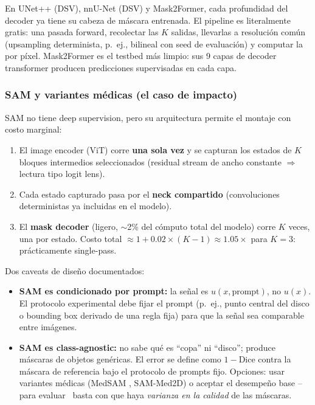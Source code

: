 \documentclass[12pt,a4paper]{article}
\newcommand{\UQ}{\text{UQ}}
\begin{document}
En UNet++ (DSV), nnU-Net (DSV) y Mask2Former, cada profundidad del decoder ya tiene su cabeza de máscara entrenada.
El pipeline es literalmente gratis: una pasada forward, recolectar las $K$ salidas, llevarlas a resolución común (upsampling determinista, p.~ej., bilineal con seed de evaluación) y computar la  por píxel.
Mask2Former es el testbed más limpio: sus 9 capas de decoder transformer producen predicciones supervisadas en cada capa.

\subsubsection{SAM y variantes médicas (el caso de impacto)}

SAM \citep{kirillov2023sam} no tiene deep supervision, pero su arquitectura permite el montaje con costo marginal:

\begin{enumerate}
    \item El image encoder (ViT) corre \textbf{una sola vez} y se capturan los estados de $K$ bloques intermedios seleccionados (residual stream de ancho constante $\Rightarrow$ lectura tipo logit lens).
    \item Cada estado capturado pasa por el \textbf{neck compartido} (convoluciones deterministas ya incluidas en el modelo).
    \item El \textbf{mask decoder} (ligero, $\sim$2\% del cómputo total del modelo) corre $K$ veces, una por estado.
    Costo total $\approx 1 + 0.02 \times (K-1) \approx 1.05\times$ para $K=3$: prácticamente single-pass.
\end{enumerate}

Dos caveats de diseño documentados:

\begin{itemize}
    \item \textbf{SAM es condicionado por prompt:} la señal es $u(x, \text{prompt})$, no $u(x)$.
    El protocolo experimental debe fijar el prompt (p.~ej., punto central del disco o bounding box derivado de una regla fija) para que la señal sea comparable entre imágenes.
    \item \textbf{SAM es class-agnostic:} no sabe qué es ``copa'' ni ``disco''; produce máscaras de objetos genéricas.
    El error se define como $1 - \mathrm{Dice}$ contra la máscara de referencia bajo el protocolo de prompts fijo.
    Opciones: usar variantes médicas (MedSAM \citep{ma2024medsam}, SAM-Med2D) o aceptar el desempeño base -- para evaluar \UQ\ basta con que haya \emph{varianza en la calidad} de las máscaras.
\end{itemize}
\end{document}
